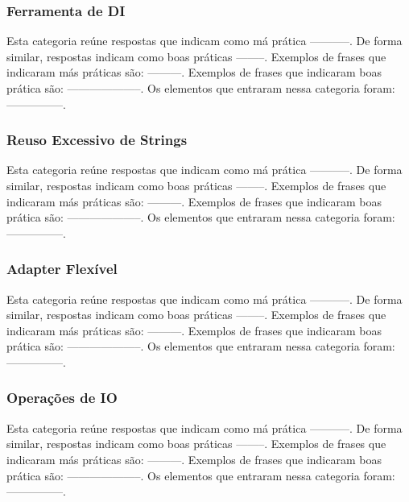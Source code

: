 \subsubsection{Ferramenta de DI}
Esta categoria re\'une respostas que indicam como m\'a pr\'atica -----------. De forma similar, respostas indicam como boas pr\'aticas --------. Exemplos de frases que indicaram m\'as pr\'aticas s\~ao: ---------. Exemplos de frases que indicaram boas pr\'atica s\~ao: --------------------. Os elementos que entraram nessa categoria foram: ---------------. 


\subsubsection{Reuso Excessivo de Strings}
Esta categoria re\'une respostas que indicam como m\'a pr\'atica -----------. De forma similar, respostas indicam como boas pr\'aticas --------. Exemplos de frases que indicaram m\'as pr\'aticas s\~ao: ---------. Exemplos de frases que indicaram boas pr\'atica s\~ao: --------------------. Os elementos que entraram nessa categoria foram: ---------------. 


\subsubsection{Adapter Flex\'ivel}
Esta categoria re\'une respostas que indicam como m\'a pr\'atica -----------. De forma similar, respostas indicam como boas pr\'aticas --------. Exemplos de frases que indicaram m\'as pr\'aticas s\~ao: ---------. Exemplos de frases que indicaram boas pr\'atica s\~ao: --------------------. Os elementos que entraram nessa categoria foram: ---------------. 


\subsubsection{Opera\c{c}\~oes de IO}
Esta categoria re\'une respostas que indicam como m\'a pr\'atica -----------. De forma similar, respostas indicam como boas pr\'aticas --------. Exemplos de frases que indicaram m\'as pr\'aticas s\~ao: ---------. Exemplos de frases que indicaram boas pr\'atica s\~ao: --------------------. Os elementos que entraram nessa categoria foram: ---------------. 

